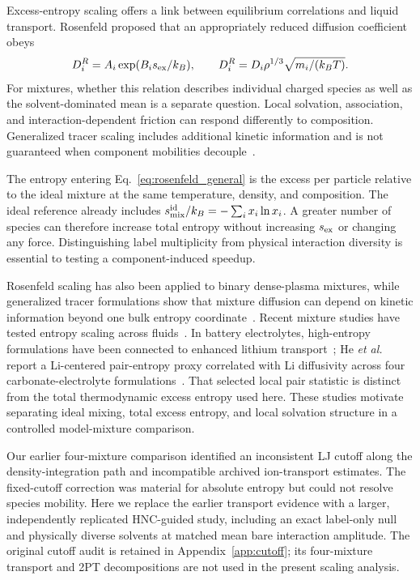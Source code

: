 \documentclass[aps,pre,twocolumn,superscriptaddress,floatfix]{revtex4-2}
\begin{document}
Excess-entropy scaling offers a link between equilibrium correlations and liquid transport. Rosenfeld proposed that an appropriately reduced diffusion coefficient obeys~\cite{Rosenfeld1977,Rosenfeld1999}
\begin{equation}
D_i^R=A_i\exp(B_i s_{\rm ex}/k_B),\qquad
D_i^R=D_i\rho^{1/3}\sqrt{m_i/(k_BT)}.
\label{eq:rosenfeld_general}
\end{equation}
For mixtures, whether this relation describes individual charged species as well as the solvent-dominated mean is a separate question. Local solvation, association, and interaction-dependent friction can respond differently to composition. Generalized tracer scaling includes additional kinetic information and is not guaranteed when component mobilities decouple~\cite{Krekelberg2009}.

The entropy entering Eq.~\eqref{eq:rosenfeld_general} is the excess per particle relative to the ideal mixture at the same temperature, density, and composition. The ideal reference already includes $s_{\rm mix}^{\rm id}/k_B=-\sum_i x_i\ln x_i$. A greater number of species can therefore increase total entropy without increasing $s_{\rm ex}$ or changing any force. Distinguishing label multiplicity from physical interaction diversity is essential to testing a component-induced speedup.

Rosenfeld scaling has also been applied to binary dense-plasma mixtures, while generalized tracer formulations show that mixture diffusion can depend on kinetic information beyond one bulk entropy coordinate~\cite{Rosenfeld1995,Krekelberg2009}. Recent mixture studies have tested entropy scaling across fluids~\cite{Schmitt2025}. In battery electrolytes, high-entropy formulations have been connected to enhanced lithium transport~\cite{Wang2023}; He \emph{et al.} report a Li-centered pair-entropy proxy correlated with Li diffusivity across four carbonate-electrolyte formulations~\cite{He2026}. That selected local pair statistic is distinct from the total thermodynamic excess entropy used here. These studies motivate separating ideal mixing, total excess entropy, and local solvation structure in a controlled model-mixture comparison.

Our earlier four-mixture comparison identified an inconsistent LJ cutoff along the density-integration path and incompatible archived ion-transport estimates. The fixed-cutoff correction was material for absolute entropy but could not resolve species mobility. Here we replace the earlier transport evidence with a larger, independently replicated HNC-guided study, including an exact label-only null and physically diverse solvents at matched mean bare interaction amplitude. The original cutoff audit is retained in Appendix~\ref{app:cutoff}; its four-mixture transport and 2PT decompositions are not used in the present scaling analysis.
\end{document}
